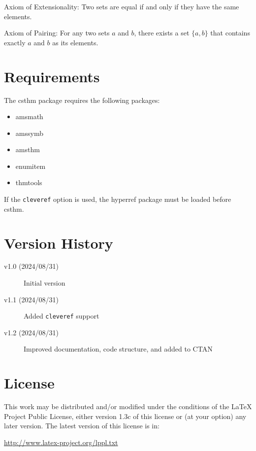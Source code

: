 \documentclass{ltxdoc}
\newcommand{\pkg}[1]{\textsf{#1}}
\newcommand{\opt}[1]{\texttt{#1}}
\begin{document}
\begin{axiom}
	\item Axiom of Extensionality: Two sets are equal if and only if they have the same elements.
	\item Axiom of Pairing: For any two sets $a$ and $b$, there exists a set $\{a, b\}$ that contains exactly $a$ and $b$ as its elements.
\end{axiom}

\section{Requirements}

The \pkg{csthm} package requires the following packages:

\begin{itemize}
	\item \pkg{amsmath}
	\item \pkg{amssymb}
	\item \pkg{amsthm}
	\item \pkg{enumitem}
	\item \pkg{thmtools}
\end{itemize}

If the \opt{cleveref} option is used, the \pkg{hyperref} package must be loaded before \pkg{csthm}.

\section{Version History}

\begin{description}
	\item[v1.0 (2024/08/31)] Initial version
	\item[v1.1 (2024/08/31)] Added \opt{cleveref} support
	\item[v1.2 (2024/08/31)] Improved documentation, code structure, and added to CTAN
\end{description}

\section{License}

This work may be distributed and/or modified under the conditions of the LaTeX Project Public License, either version 1.3c of this license or (at your option) any later version. The latest version of this license is in:

\url{http://www.latex-project.org/lppl.txt}
\end{document}
